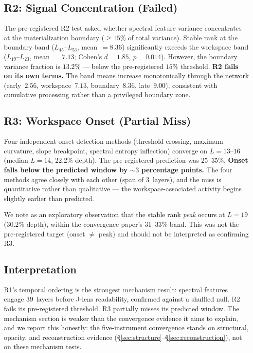 \documentclass[11pt,a4paper]{article}
\begin{document}
\subsection{R2: Signal Concentration (Failed)}

The pre-registered R2 test asked whether spectral feature variance
concentrates at the materialization boundary (${\geq}15\%$ of total
variance). Stable rank at the boundary band ($L_{45}$--$L_{53}$,
mean~$= 8.36$) significantly exceeds the workspace band
($L_{19}$--$L_{23}$, mean~$= 7.13$; Cohen's $d{=}1.85$,
$p{=}0.014$). However, the boundary variance fraction is $13.2\%$
--- below the pre-registered $15\%$ threshold. \textbf{R2 fails on its
own terms.} The band means increase monotonically through the network
(early~$2.56$, workspace~$7.13$, boundary~$8.36$, late~$9.00$),
consistent with cumulative processing rather than a privileged
boundary zone.

\subsection{R3: Workspace Onset (Partial Miss)}

Four independent onset-detection methods (threshold crossing, maximum
curvature, slope breakpoint, spectral entropy inflection) converge on
$L{=}13$--$16$ (median $L{=}14$, $22.2\%$ depth). The pre-registered
prediction was $25$--$35\%$. \textbf{Onset falls below the predicted
window by ${\sim}3$ percentage points.} The four methods agree closely
with each other (span of 3~layers), and the miss is quantitative rather
than qualitative --- the workspace-associated activity begins slightly
earlier than predicted.

We note as an exploratory observation that the stable rank \emph{peak}
occurs at $L{=}19$ ($30.2\%$ depth), within the convergence paper's
$31$--$33\%$ band. This was not the pre-registered target
(onset $\neq$ peak) and should not be interpreted as confirming R3.

\subsection{Interpretation}

R1's temporal ordering is the strongest mechanism result: spectral
features engage 39~layers before J-lens readability, confirmed
against a shuffled null. R2 fails its pre-registered threshold.
R3 partially misses its predicted window. The mechanism section
is weaker than the convergence evidence it aims to explain, and we
report this honestly: the five-instrument convergence stands on
structural, opacity, and reconstruction evidence
(\S\ref{sec:structure}--\S\ref{sec:reconstruction}), not on these
mechanism tests.
\end{document}
